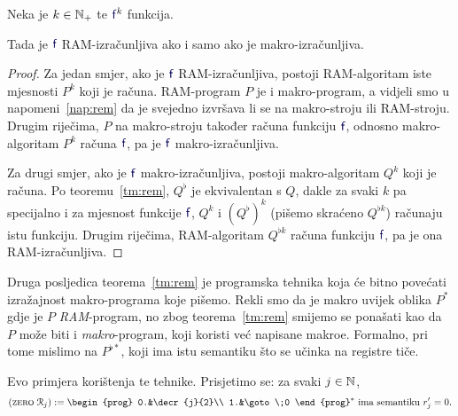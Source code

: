 \begin{korolar}[{name=[RAM-izračunljivost je ekvivalentna makro-izračunljivosti]}]\label{kor:rem}
Neka je $k\in{\mathbb N}_+$ te $\f f^k$ funkcija.

    Tada je $\f f$ RAM-izračunljiva ako i samo ako je makro-izračunljiva.
\end{korolar}
\begin{proof}
Za jedan smjer, ako je $\f f$ RAM-izračunljiva, postoji RAM-algoritam iste mjesnosti $P^k$ koji je računa.  RAM-program $P$ je i makro-program, a vidjeli smo u napomeni~\ref{nap:rem} da je svejedno izvršava li se na makro-stroju ili RAM-stroju. Drugim riječima, $P$ na makro-stroju također računa funkciju $\f f$, odnosno makro-algoritam $P^k$ računa $\f f$, pa je $\f f$ makro-izračunljiva.

Za drugi smjer, ako je $\f f$ makro-izračunljiva, postoji makro-algoritam $Q^k$ koji je računa. Po teoremu~\ref{tm:rem}, $Q^\flat$ je ekvivalentan s $Q$, dakle za svaki $k$ pa specijalno i za mjesnost funkcije $\f f$, $Q^k$ i $(Q^\flat)^k$ (pišemo skraćeno $Q^{\flat k}$) računaju istu funkciju. Drugim riječima, RAM-algoritam $Q^{\flat k}$ računa funkciju $\f f$, pa je ona RAM-izračunljiva.
\end{proof}

\begin{napomena}[{name=[makroi višeg reda]}]
Druga posljedica teorema~\ref{tm:rem} je programska tehnika koja će bitno povećati izražajnost makro-programa koje pišemo. Rekli smo da je makro uvijek oblika $P^*$ gdje je $P$ \emph{RAM}-program, no zbog teorema~\ref{tm:rem} smijemo se ponašati kao da $P$ može biti i \emph{makro}-program, koji koristi već napisane makroe. Formalno, pri tome mislimo na $P^{\flat*}$\!, koji ima istu semantiku što se učinka na registre tiče.
\end{napomena}


Evo primjera korištenja te tehnike.
Prisjetimo se: za svaki $j\in{\mathbb N}$,
\begin{equation}
(\textsc{zero}\;\reg{j}):=\begin{prog}
0.&\decr{j}{2}\\
1.&\goto\;0
\end{prog}^*\text{
 ima semantiku $r_j'=0$.}
\end{equation}

